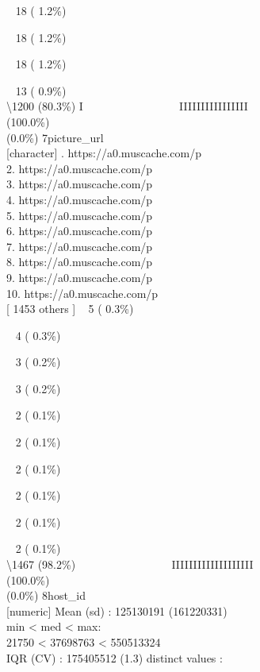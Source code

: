 \documentclass[
  journal,
]{IEEEtran}%
\begin{document}
\strut ~ 18 ( 1.2\%)\\
\strut ~ 18 ( 1.2\%)\\
\strut ~ 18 ( 1.2\%)\\
\strut ~ 13 ( 0.9\%)\\
\textbackslash1200 (80.3\%) \textbar{} \textbar I ~ ~ ~ ~ ~ ~ ~ ~ ~ ~
IIIIIIIIIIIIIIII \\
(100.0\%) \\
(0.0\%) \textbar{} \textbar{} 7\textbar picture\_url\\
{[}character{]} . https://a0.muscache.com/p\\
2. https://a0.muscache.com/p\\
3. https://a0.muscache.com/p\\
4. https://a0.muscache.com/p\\
5. https://a0.muscache.com/p\\
6. https://a0.muscache.com/p\\
7. https://a0.muscache.com/p\\
8. https://a0.muscache.com/p\\
9. https://a0.muscache.com/p\\
10. https://a0.muscache.com/p\\
{[} 1453 others {]} \textbar~ 5 ( 0.3\%)\\
\strut ~ 4 ( 0.3\%)\\
\strut ~ 3 ( 0.2\%)\\
\strut ~ 3 ( 0.2\%)\\
\strut ~ 2 ( 0.1\%)\\
\strut ~ 2 ( 0.1\%)\\
\strut ~ 2 ( 0.1\%)\\
\strut ~ 2 ( 0.1\%)\\
\strut ~ 2 ( 0.1\%)\\
\strut ~ 2 ( 0.1\%)\\
\textbackslash1467 (98.2\%) \textbar{} \textbar~ ~ ~ ~ ~ ~ ~ ~ ~ ~
IIIIIIIIIIIIIIIIIII \\
(100.0\%) \\
(0.0\%) \textbar{} \textbar{} 8\textbar host\_id\\
{[}numeric{]} \textbar Mean (sd) : 125130191 (161220331)\\
min \textless{} med \textless{} max:\\
21750 \textless{} 37698763 \textless{} 550513324\\
IQR (CV) : 175405512 (1.3)  distinct values \textbar{}
\textbar:\\
\end{document}
